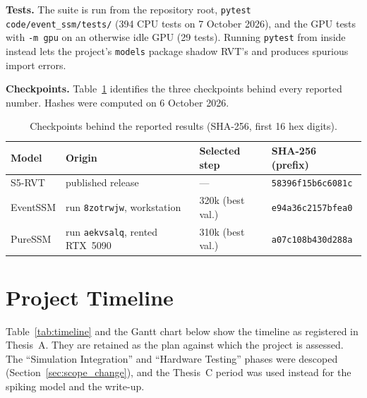 \documentclass[11pt, a4paper]{report}
\begin{document}
\textbf{Tests.} The suite is run from the repository root, \texttt{pytest code/event\_ssm/tests/} (394 CPU
tests on 7 October 2026), and the GPU tests with \texttt{-m gpu} on an otherwise idle GPU (29 tests).
Running \texttt{pytest} from inside  instead lets the project's \texttt{models} package
shadow RVT's and produces spurious import errors.

\textbf{Checkpoints.} Table~\ref{tab:ckpts} identifies the three checkpoints behind every reported number.
Hashes were computed on 6 October 2026.

\begin{table}[htbp]
\centering
\small
\caption{Checkpoints behind the reported results (SHA-256, first 16 hex digits).}
\label{tab:ckpts}
\begin{tabular}{llll}
\toprule
Model & Origin & Selected step & SHA-256 (prefix) \\
\midrule
S5-RVT & published release~\cite{zubic2024state} & --- & \texttt{58396f15b6c6081c} \\
EventSSM & run \texttt{8zotrwjw}, workstation & 320k (best val.) & \texttt{e94a36c2157bfea0} \\
PureSSM & run \texttt{aekvsalq}, rented RTX~5090 & 310k (best val.) & \texttt{a07c108b430d288a} \\
\bottomrule
\end{tabular}
\end{table}

\chapter{Project Timeline}
\label{app:gantt}
Table~\ref{tab:timeline} and the Gantt chart below show the timeline as registered in Thesis~A. They are
retained as the plan against which the project is assessed. The ``Simulation Integration'' and ``Hardware
Testing'' phases were descoped (Section~\ref{sec:scope_change}), and the Thesis~C period was used instead
for the spiking model and the write-up.
\end{document}
